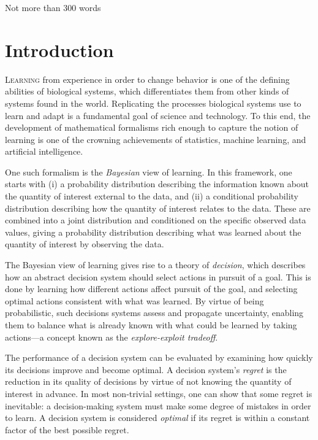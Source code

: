 \documentclass[11pt]{book}
\begin{document}
Not more than 300 words

\tableofcontents





\chapter{Introduction}
\label{ch:intro}

\lettrine{L}{earning} from experience in order to change behavior is one of the defining abilities of biological systems, which differentiates them from other kinds of systems found in the world.
Replicating the processes biological systems use to learn and adapt is a fundamental goal of science and technology.
To this end, the development of mathematical formalisms rich enough to capture the notion of learning is one of the crowning achievements of statistics, machine learning, and artificial intelligence.

One such formalism is the \emph{Bayesian} view of learning.
In this framework, one starts with (i) a probability distribution describing the information known about the quantity of interest external to the data, and (ii) a conditional probability distribution describing how the quantity of interest relates to the data.
These are combined into a joint distribution and conditioned on the specific observed data values, giving a probability distribution describing what was learned about the quantity of interest by observing the data.

The Bayesian view of learning gives rise to a theory of \emph{decision}, which describes how an abstract decision system should select actions in pursuit of a goal.
This is done by learning how different actions affect pursuit of the goal, and selecting optimal actions consistent with what was learned.
By virtue of being probabilistic, such decisions systems assess and propagate uncertainty, enabling them to balance what is already known with what could be learned by taking actions---a concept known as the \emph{explore-exploit tradeoff}.

The performance of a decision system can be evaluated by examining how quickly its decisions improve and become optimal.
A decision system's \emph{regret} is the reduction in its quality of decisions by virtue of not knowing the quantity of interest in advance.
In most non-trivial settings, one can show that some regret is inevitable: a decision-making system must make some degree of mistakes in order to learn.
A decision system is considered \emph{optimal} if its regret is within a constant factor of the best possible regret.
\end{document}
